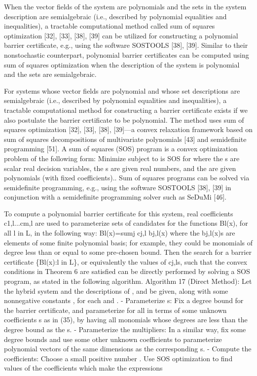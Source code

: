 When the vector fields of
the system are polynomials and the sets in the system description
are semialgebraic (i.e., described by polynomial equalities
and inequalities), a tractable computational method called sum
of squares optimization [32], [33], [38], [39] can be utilized for
constructing a polynomial barrier certificate, e.g., using the software
SOSTOOLS [38], [39]. \citep{bib:barrier_prajna} Similar to their nonstochastic counterpart,
polynomial barrier certificates can be computed using sum of
squares optimization when the description of the system is polynomial
and the sets are semialgebraic.

For systems whose vector fields are polynomial and whose
set descriptions are semialgebraic (i.e., described by polynomial
equalities and inequalities), a tractable computational method
for constructing a barrier certificate exists if we also postulate
the barrier certificate to be polynomial. The method uses sum of
squares optimization [32], [33], [38], [39]—a convex relaxation
framework based on sum of squares decompositions of multivariate
polynomials [43] and semidefinite programming [51].
A sum of squares (SOS) program is a convex optimization
problem of the following form:
Minimize
subject to
is SOS for
where the s are scalar real decision variables, the s are
given real numbers, and the are given polynomials
(with fixed coefficients).\citep{bib:barrier_prajna}. Sum of squares programs can be
solved via semidefinite programming, e.g., using the software
SOSTOOLS [38], [39] in conjunction with a semidefinite
programming solver such as SeDuMi [46].

To compute a polynomial barrier certificate for this system,
real coefficients c1,l...cm,l are used to parameterize sets of
candidates for the functions Bl(x), for all l in L, in the following
way: Bl(x)=sumj cj,l bj,l(x)
where the bj,l(x)s are elements of some finite polynomial basis;
for example, they could be monomials of degree less than or
equal to some pre-chosen bound. Then the search for a barrier
certificate \{Bl(x):l in L\}, or equivalently the values of cj,ls,
such that the convex conditions in Theorem 6 are satisfied can
be directly performed by solving a SOS program, as stated in
the following algorithm. \citep{bib:barrier_prajna} Algorithm 17 (Direct Method): Let the hybrid system and
the descriptions of ,
and be given, along with some nonnegative constants
, for each and .
- Parameterize s: Fix a degree bound for the barrier
certificate, and parameterize for all in terms
of some unknown coefficients s as in (35), by having all
monomials whose degrees are less than the degree bound
as the s.
- Parameterize the multipliers: In a similar way, fix
some degree bounds and use some other unknown coefficients
to parameterize polynomial vectors
of the same dimensions as the corresponding
s.
- Compute the coefficients: Choose a small positive
number . Use SOS optimization to find values of the
coefficients which make the expressions

